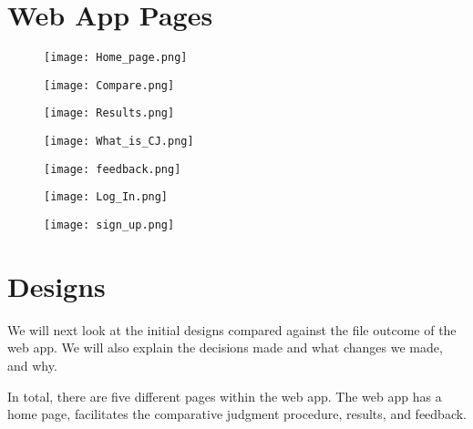 \chapter{Web App Pages}
\label{app:web_designs}

\begin{figure}[h]
	\centering
	\texttt{[image: Home\_page.png]}
	\caption{}
	
		
	\end{figure} 
\begin{figure}[h]
	\centering
	\texttt{[image: Compare.png]}
	\caption{}
	
		
	\end{figure} 

\begin{figure}[h]
	\centering
	\texttt{[image: Results.png]}
	\caption{}
	
		
	\end{figure} 

\begin{figure}[h]
	\centering
	\texttt{[image: What\_is\_CJ.png]}
	\caption{}

		
	\end{figure} 
\begin{figure}[h]
	\centering
	\texttt{[image: feedback.png]}
	\caption{}
		
	\end{figure} 

\begin{figure}[h]
	\centering
	\texttt{[image: Log\_In.png]}
	\caption{}
	
\end{figure} 


\begin{figure}[h]
	\centering
	\texttt{[image: sign\_up.png]}
	\caption{}
	
\end{figure} 

\chapter{Designs}
We will next look at the initial designs compared against the file outcome of the web app. We will also explain the decisions made and what changes we made, and why. 

In total, there are five different pages within the web app. The web app has a home page, facilitates the comparative judgment procedure, results, and feedback.

